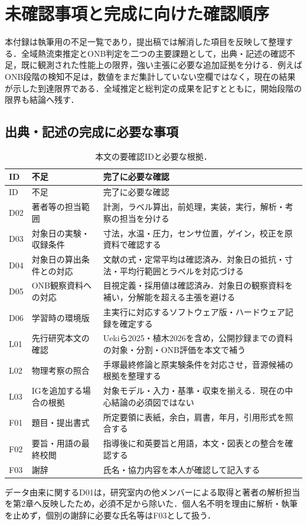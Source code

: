 \chapter{未確認事項と完成に向けた確認順序}\label{app:gaps}
本付録は執筆用の不足一覧であり，提出稿では解消した項目を反映して整理する．全域熱流束推定とONB判定を二つの主要課題として，出典・記述の確認不足，既に観測された性能上の限界，強い主張に必要な追加証拠を分ける．例えばONB段階の検知不足は，数値をまだ集計していない空欄ではなく，現在の結果が示した到達限界である．全域推定と総判定の成果を記すとともに，開始段階の限界も結論へ残す．

\section{出典・記述の完成に必要な事項}
\begin{longtable}{L{13mm}L{46mm}L{70mm}}
\caption{本文の要確認IDと必要な根拠．}\\
\toprule ID & 不足 & 完了に必要な確認 \\ \midrule\endfirsthead
\toprule ID & 不足 & 完了に必要な確認 \\ \midrule\endhead
D02 & 著者等の担当範囲 & 計測，ラベル算出，前処理，実装，実行，解析・考察の担当を分ける \\
D03 & 対象日の実験・収録条件 & 寸法，水温・圧力，センサ位置，ゲイン，校正を原資料で確認する \\
D04 & 対象日の算出条件との対応 & 文献の式・定常平均は確認済み．対象日の抵抗・寸法・平均行範囲とラベルを対応づける \\
D05 & ONB観察資料への対応 & 目視定義・採用値は確認済み．対象日の観察資料を補い，分解能を超える主張を避ける \\
D06 & 学習時の環境版 & 主実行に対応するソフトウェア版・ハードウェア記録を確定する \\
L01 & 先行研究本文の確認 & Uekiら2025・植木2026を含め，公開抄録までの資料の対象・分割・ONB評価を本文で補う \\
L02 & 物理考察の照合 & 手塚最終修論と原実験条件を対応させ，音源候補の根拠を整理する \\
L03 & IGを追加する場合の根拠 & 対象モデル・入力・基準・収束を揃える．現在の中心結論の必須図ではない \\
F01 & 題目・提出書式 & 所定要領に表紙，余白，肩書，年月，引用形式を照合する \\
F02 & 要旨・用語の最終校閲 & 指導後に和英要旨と用語，本文・図表との整合を確認する \\
F03 & 謝辞 & 氏名・協力内容を本人が確認して記入する \\
\bottomrule
\end{longtable}
データ由来に関するD01は，研究室内の他メンバーによる取得と著者の解析担当を第2章へ反映したため，必須不足から除いた．個人名不明を理由に解析・執筆を止めず，個別の謝辞に必要な氏名等はF03として扱う．

